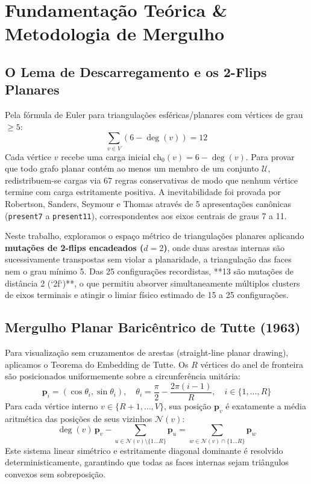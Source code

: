 \documentclass[10pt,a4paper]{article}
\begin{document}
\section{Fundamentação Teórica \& Metodologia de Mergulho}

\subsection{O Lema de Descarregamento e os 2-Flips Planares}
Pela fórmula de Euler para triangulações esféricas/planares com vértices de grau $\ge 5$:
\begin{equation}
\sum_{v \in V} (6 - \deg(v)) = 12
\end{equation}
Cada vértice $v$ recebe uma carga inicial $\text{ch}_0(v) = 6 - \deg(v)$. Para provar que todo grafo planar contém ao menos um membro de um conjunto $\mathcal{U}$, redistribuem-se cargas via 67 regras conservativas de modo que nenhum vértice termine com carga estritamente positiva. A inevitabilidade foi provada por Robertson, Sanders, Seymour e Thomas através de 5 apresentações canônicas (\texttt{present7} a \texttt{present11}), correspondentes aos eixos centrais de graus 7 a 11.

Neste trabalho, exploramos o espaço métrico de triangulações planares aplicando \textbf{mutações de 2-flips encadeados ($d=2$)}, onde duas arestas internas são sucessivamente transpostas sem violar a planaridade, a triangulação das faces nem o grau mínimo 5. Das 25 configurações recordistas, **13 são mutações de distância 2 (`2f`)**, o que permitiu absorver simultaneamente múltiplos clusters de eixos terminais e atingir o limiar físico estimado de 15 a 25 configurações.

\subsection{Mergulho Planar Baricêntrico de Tutte (1963)}
Para visualização sem cruzamentos de arestas (straight-line planar drawing), aplicamos o Teorema do Embedding de Tutte. Os $R$ vértices do anel de fronteira são posicionados uniformemente sobre a circunferência unitária:
\begin{equation}
\mathbf{p}_i = \left( \cos\theta_i, \sin\theta_i \right), \quad \theta_i = \frac{\pi}{2} - \frac{2\pi (i-1)}{R}, \quad i \in \{1, \dots, R\}
\end{equation}
Para cada vértice interno $v \in \{R+1, \dots, V\}$, sua posição $\mathbf{p}_v$ é exatamente a média aritmética das posições de seus vizinhos $\mathcal{N}(v)$:
\begin{equation}
\deg(v) \, \mathbf{p}_v - \sum_{u \in \mathcal{N}(v) \setminus \{1\dots R\}} \mathbf{p}_u = \sum_{w \in \mathcal{N}(v) \cap \{1\dots R\}} \mathbf{p}_w
\end{equation}
Este sistema linear simétrico e estritamente diagonal dominante é resolvido deterministicamente, garantindo que todas as faces internas sejam triângulos convexos sem sobreposição.
\end{document}
